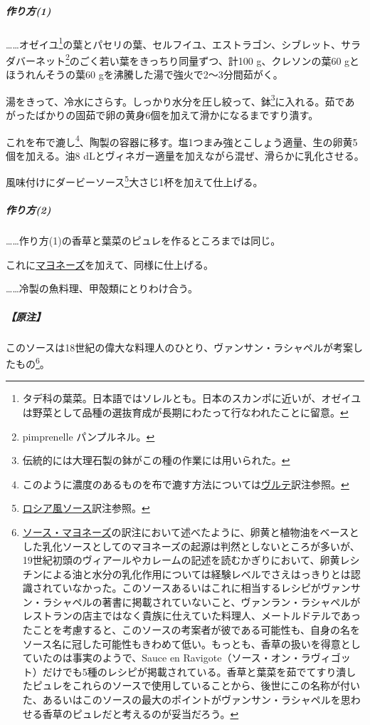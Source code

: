 \begin{recette}

 

\hypertarget{sauce-vincent-1}{%
\subparagraph{作り方(1)}\label{sauce-vincent-1}}

\ldots{}\ldots{}オゼイユ\footnote{タデ科の葉菜。日本語ではソレルとも。日本のスカンポに近いが、オゼイユは野菜として品種の選抜育成が長期にわたって行なわれたことに留意。}の葉とパセリの葉、セルフイユ、エストラゴン、シブレット、サラダバーネット\footnote{pimprenelle
  パンプルネル。}のごく若い葉をきっちり同量ずつ、計100 g、クレソンの葉60
gとほうれんそうの葉60 gを沸騰した湯で強火で2〜3分間茹がく。

湯をきって、冷水にさらす。しっかり水分を圧し絞って、鉢\footnote{伝統的には大理石製の鉢がこの種の作業には用いられた。}に入れる。茹であがったばかりの固茹で卵の黄身6個を加えて滑かになるまですり潰す。

これを布で漉し\footnote{このように濃度のあるものを布で漉す方法については\protect\hyperlink{veloute}{ヴルテ}訳注参照。}、陶製の容器に移す。塩1つまみ強とこしょう適量、生の卵黄5個を加える。油8
dLとヴィネガー適量を加えながら混ぜ、滑らかに乳化させる。

風味付けにダービーソース\footnote{\protect\hyperlink{sauce-russe-froide}{ロシア風ソース}訳注参照。}大さじ1杯を加えて仕上げる。

\hypertarget{sauce-vincent-2}{%
\subparagraph{作り方(2)}\label{sauce-vincent-2}}

\ldots{}\ldots{}作り方(1)の香草と葉菜のピュレを作るところまでは同じ。

これに\protect\hyperlink{mayonnaise}{マヨネーズ}を加えて、同様に仕上げる。

\ldots{}\ldots{}冷製の魚料理、甲殻類にとりわけ合う。

\hypertarget{nota-sauce-vincent}{%
\subparagraph{【原注】}\label{nota-sauce-vincent}}

このソースは18世紀の偉大な料理人のひとり、ヴァンサン・ラシャペルが考案したもの\footnote{\protect\hyperlink{mayonnaise}{ソース・マヨネーズ}の訳注において述べたように、卵黄と植物油をベースとした乳化ソースとしてのマヨネーズの起源は判然としないところが多いが、19世紀初頭のヴィアールやカレームの記述を読むかぎりにおいて、卵黄レシチンによる油と水分の乳化作用については経験レベルでさえはっきりとは認識されていなかった。このソースあるいはこれに相当するレシピがヴァンサン・ラシャペルの著書に掲載されていないこと、ヴァンラン・ラシャペルがレストランの店主ではなく貴族に仕えていた料理人、メートルドテルであったことを考慮すると、このソースの考案者が彼である可能性も、自身の名をソース名に冠した可能性もきわめて低い。もっとも、香草の扱いを得意としていたのは事実のようで、Sauce
  en
  Ravigote（ソース・オン・ラヴィゴット）だけでも5種のレシピが掲載されている。香草と葉菜を茹でてすり潰したピュレをこれらのソースで使用していることから、後世にこの名称が付いた、あるいはこのソースの最大のポイントがヴァンサン・ラシャペルを思わせる香草のピュレだと考えるのが妥当だろう。}。


\end{recette}
